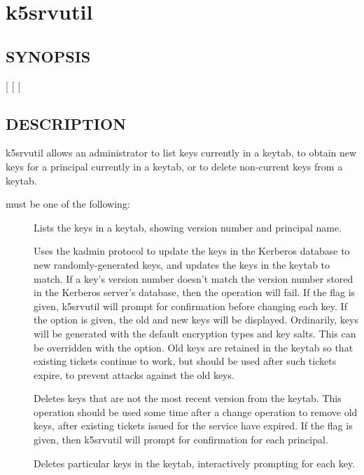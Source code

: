 \documentclass[letterpaper,10pt,english]{sphinxmanual}
\begin{document}
\section{k5srvutil}
\label{\detokenize{admin/admin_commands/k5srvutil:k5srvutil-1}}\label{\detokenize{admin/admin_commands/k5srvutil::doc}}\label{\detokenize{admin/admin_commands/k5srvutil:k5srvutil}}

\subsection{SYNOPSIS}
\label{\detokenize{admin/admin_commands/k5srvutil:synopsis}}
 
{[}\sphinxstylestrong{-i}{]}
{[} \sphinxstyleemphasis{filename}{]}
{[} \sphinxstyleemphasis{keysalts}{]}


\subsection{DESCRIPTION}
\label{\detokenize{admin/admin_commands/k5srvutil:description}}
k5srvutil allows an administrator to list keys currently in
a keytab, to obtain new keys for a principal currently in a keytab,
or to delete non-current keys from a keytab.

 must be one of the following:
\begin{description}
\item[{}] \leavevmode
Lists the keys in a keytab, showing version number and principal
name.

\item[{}] \leavevmode
Uses the kadmin protocol to update the keys in the Kerberos
database to new randomly-generated keys, and updates the keys in
the keytab to match.  If a key’s version number doesn’t match the
version number stored in the Kerberos server’s database, then the
operation will fail.  If the  flag is given, k5srvutil will
prompt for confirmation before changing each key.  If the 
option is given, the old and new keys will be displayed.
Ordinarily, keys will be generated with the default encryption
types and key salts.  This can be overridden with the 
option.  Old keys are retained in the keytab so that existing
tickets continue to work, but  should be used after
such tickets expire, to prevent attacks against the old keys.

\item[{}] \leavevmode
Deletes keys that are not the most recent version from the keytab.
This operation should be used some time after a change operation
to remove old keys, after existing tickets issued for the service
have expired.  If the  flag is given, then k5srvutil will
prompt for confirmation for each principal.

\item[{}] \leavevmode
Deletes particular keys in the keytab, interactively prompting for
each key.

\end{description}
\end{document}
